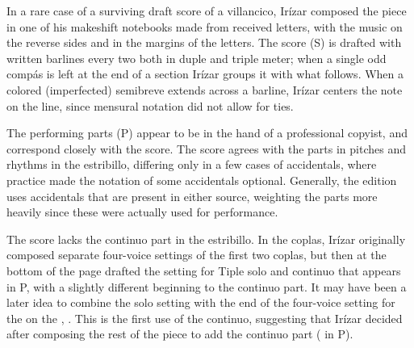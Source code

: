 
\begin{notesources}

    \begin{source}
         
    \end{source}

    \begin{source}
    \end{source}

\end{notesources}

In a rare case of a surviving draft score of a villancico, Irízar composed the 
piece in one of his makeshift notebooks made from received letters, with the 
music on the reverse sides and in the margins of the letters.%
  \Autocites[285--338]{Cashner:PhD}
  {LopezCalo:Segovia}{Olarte:Irizar}
  {LopezCalo:IrizarLetters1}{Rodriguez:Networks}
The score (S) is drafted with written barlines every two  both 
in duple and triple meter; when a single odd compás is left at the end of a
section Irízar groups it with what follows.
When a colored (imperfected) semibreve extends across a barline, Irízar centers 
the note on the line, since mensural notation did not allow for ties.

The performing parts (P) appear to be in the hand of a professional copyist, 
and correspond closely with the score.
The score agrees with the parts in pitches and rhythms in the estribillo, 
differing only in a few cases of accidentals, where  
practice made the notation of some accidentals optional.
Generally, the edition uses accidentals that are present in either source,
weighting the parts more heavily since these were actually used for
performance.

The score lacks the  continuo part in the estribillo.
In the coplas, Irízar originally composed separate four-voice settings of the 
first two coplas, but then at the bottom of the page drafted the setting for 
Tiple solo and continuo that appears in P, with a slightly different beginning 
to the continuo part.
It may have been a later idea to combine the solo setting with the end of the 
four-voice setting for the  on the , .
This is the first use of the continuo, suggesting that Irízar decided after 
composing the rest of the piece to add the continuo part ( in P).

